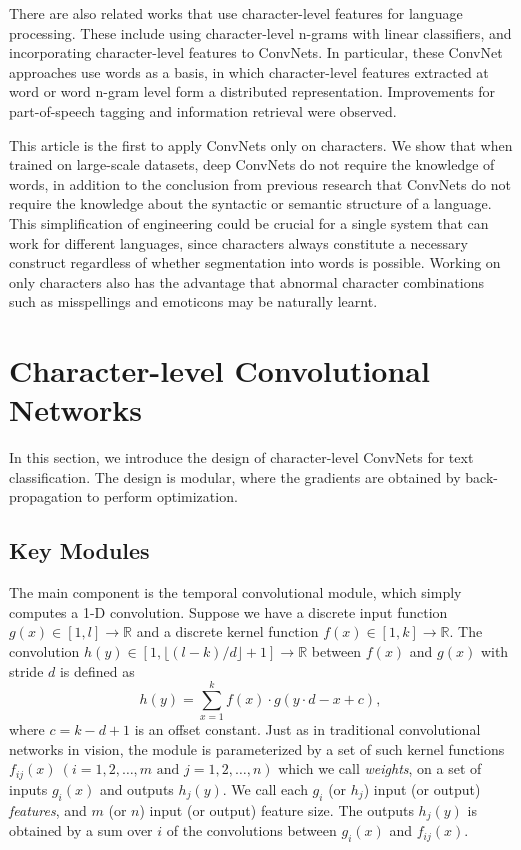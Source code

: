 \documentclass{article} \usepackage{nips15submit_e,times}
\begin{document}
There are also related works that use character-level features for language processing. These include using character-level n-grams with linear classifiers\cite{KKHS07}, and incorporating character-level features to ConvNets\cite{SZ14}\cite{SHGDM14}. In particular, these ConvNet approaches use words as a basis, in which character-level features extracted at word\cite{SZ14} or word n-gram\cite{SHGDM14} level form a distributed representation. Improvements for part-of-speech tagging and information retrieval were observed.

This article is the first to apply ConvNets only on characters. We show that when trained on large-scale datasets, deep ConvNets do not require the knowledge of words, in addition to the conclusion from previous research that ConvNets do not require the knowledge about the syntactic or semantic structure of a language. This simplification of engineering could be crucial for a single system that can work for different languages, since characters always constitute a necessary construct regardless of whether segmentation into words is possible. Working on only characters also has the advantage that abnormal character combinations such as misspellings and emoticons may be naturally learnt.

\section{Character-level Convolutional Networks}

In this section, we introduce the design of character-level ConvNets for text classification. The design is modular, where the gradients are obtained by back-propagation\cite{RHW86} to perform optimization.

\subsection{Key Modules}

The main component is the temporal convolutional module, which simply computes a 1-D convolution. Suppose we have a discrete input function \(g(x) \in [1,l] \rightarrow \mathbb{R}\) and a discrete kernel function \(f(x) \in [1, k] \rightarrow \mathbb{R}\). The convolution \(h(y) \in [1,\lfloor (l-k)/d \rfloor + 1] \rightarrow \mathbb{R}\)  between \(f(x)\) and \(g(x)\) with stride \(d\) is defined as
\[
h(y) = \sum_{x = 1}^{k} f(x) \cdot g(y \cdot d - x + c),
\]
where \(c = k - d + 1\) is an offset constant. Just as in traditional convolutional networks in vision, the module is parameterized by a set of such kernel functions \(f_{ij} (x) ~ (i = 1, 2, \dots, m \text{ and } j = 1, 2, \dots, n )\) which we call \textit{weights}, on a set of inputs \(g_i(x) \) and outputs \(h_j(y)\). We call each \(g_i\) (or \(h_j\)) input (or output) \textit{features}, and \(m\) (or \(n\)) input (or output) feature size. The outputs \(h_j(y)\) is obtained by a sum over \(i\) of the convolutions between \(g_i(x)\) and \(f_{ij}(x)\).
\end{document}
